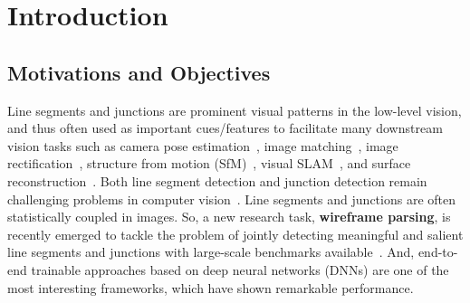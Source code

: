 \documentclass[10pt,twocolumn,letterpaper]{article}
\begin{document}
\vspace{-2mm}
\section{Introduction}
\vspace{-1mm}
\subsection{Motivations and Objectives}
\vspace{-2mm}
Line segments and junctions are prominent visual patterns in the low-level vision, and thus often used as important cues/features to facilitate many downstream vision tasks such as camera pose estimation~\cite{PribylZC15,PribylZC17,DuffKLP19}, image matching~\cite{asj-tip}, image rectification~\cite{XueXX019}, structure from motion (SfM)~\cite{BartoliS05,MicusikW17}, visual SLAM~\cite{Lemaire2007,ZhouZPYLY15,Zuo2017}, and surface reconstruction~\cite{LangloisBM19}. Both line segment detection and junction detection remain challenging problems in computer vision~\cite{XiaDG2014,afm,afm-pami}. Line segments and junctions are often statistically coupled in images. So, a new research task, \textbf{wireframe parsing}, is recently emerged to tackle the problem of jointly detecting meaningful and salient line segments and junctions with large-scale benchmarks available~\cite{Huang2018a}. And, end-to-end trainable approaches based on deep neural networks (DNNs) are one of the most interesting frameworks, which have shown remarkable performance.
\end{document}
